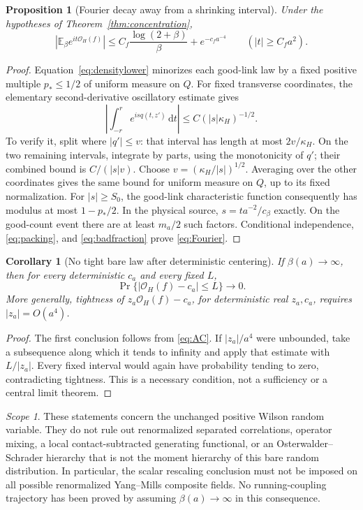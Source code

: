 \documentclass[11pt,letterpaper]{article}
\numberwithin{equation}{section}
\theoremstyle{plain}
\newtheorem{corollary}[theorem]{Corollary}
\newtheorem{proposition}[theorem]{Proposition}
\theoremstyle{remark}
\newtheorem{remark}[theorem]{Scope}
\newcommand{\E}{\mathbb E}
\newcommand{\dd}{\,\mathrm d}
\newcommand{\OH}{\mathcal O_H}
\begin{document}
\begin{proposition}[Fourier decay away from a shrinking interval]
Under the hypotheses of Theorem~\ref{thm:concentration},
\begin{equation}
 \left|\E_\beta e^{it\OH(f)}\right|
 \le C_f\frac{\log(2+\beta)}{\beta}+e^{-c_fa^{-4}}
 \qquad(|t|\ge C_fa^2).
 \label{eq:Fourier}
\end{equation}
\end{proposition}
\begin{proof}
Equation~\eqref{eq:densitylower} minorizes each good-link law by a fixed positive
multiple $p_*\le1/2$ of uniform measure on $Q$. For fixed transverse coordinates,
the elementary second-derivative oscillatory estimate gives
\[
 \left|\int_{-r}^re^{isq(t,z')}\dd t\right|\le C(|s|\kappa_H)^{-1/2}.
\]
To verify it, split where $|q'|\le v$: that interval has length at most
$2v/\kappa_H$. On the two remaining intervals, integrate by parts, using the
monotonicity of $q'$; their combined bound is $C/(|s|v)$. Choose
$v=(\kappa_H/|s|)^{1/2}$. Averaging over the other coordinates gives the same
bound for uniform measure on $Q$, up to its fixed normalization.
For $|s|\ge S_0$, the good-link characteristic function consequently has modulus
at most $1-p_*/2$. In the physical source, $s=ta^{-2}/c_\beta$ exactly. On the
good-count event there are at least $m_a/2$ such factors. Conditional independence,
\eqref{eq:packing}, and \eqref{eq:badfraction} prove \eqref{eq:Fourier}.
\end{proof}

\begin{corollary}[No tight bare law after deterministic centering]
If $\beta(a)\to\infty$, then for every deterministic $c_a$ and every fixed $L$,
\[
 \Pr\{|\OH(f)-c_a|\le L\}\longrightarrow0.
\]
More generally, tightness of $z_a\OH(f)-c_a$, for deterministic real $z_a,c_a$,
requires $|z_a|=O(a^4)$.
\end{corollary}
\begin{proof}
The first conclusion follows from \eqref{eq:AC}. If $|z_a|/a^4$ were unbounded,
take a subsequence along which it tends to infinity and apply that estimate with
$L/|z_a|$. Every fixed interval would again have probability tending to zero,
contradicting tightness. This is a necessary condition, not a sufficiency or a
central limit theorem.
\end{proof}

\begin{remark}
These statements concern the unchanged positive Wilson random variable. They
do not rule out renormalized separated correlations, operator mixing, a local
contact-subtracted generating functional, or an Osterwalder--Schrader hierarchy
that is not the moment hierarchy of this bare random distribution. In particular,
the scalar rescaling conclusion must not be imposed on all possible renormalized
Yang--Mills composite fields. No running-coupling trajectory has been proved by
assuming $\beta(a)\to\infty$ in this consequence.
\end{remark}
\end{document}
